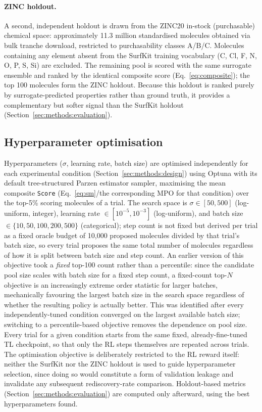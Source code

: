 \documentclass[11pt]{aime}
\begin{document}
\paragraph{ZINC holdout.}
A second, independent holdout is drawn from the ZINC20 in-stock (purchasable) chemical space\cite{irwin_zinc20_2020}: approximately 11.3 million standardised molecules obtained via bulk tranche download, restricted to purchasability classes A/B/C.
Molecules containing any element absent from the SurfKit training vocabulary (C, Cl, F, N, O, P, S, Si) are excluded.
The remaining pool is scored with the same surrogate ensemble and ranked by the identical composite score (Eq.~\ref{eq:composite}); the top 100 molecules form the ZINC holdout.
Because this holdout is ranked purely by surrogate-predicted properties rather than ground truth, it provides a complementary but softer signal than the SurfKit holdout (Section~\ref{sec:methods:evaluation}).

\subsection{Hyperparameter optimisation}
\label{sec:methods:hpo}

Hyperparameters ($\sigma$, learning rate, batch size) are optimised independently for each experimental condition (Section~\ref{sec:methods:design}) using Optuna\cite{optuna_2019} with its default tree-structured Parzen estimator sampler\cite{bergstra_algorithms_2011}, maximising the mean composite \texttt{Score} (Eq.~\ref{eq:sm}/the corresponding MPO for that condition) over the top-5\% scoring molecules of a trial.
The search space is $\sigma\in[50,500]$ (log-uniform, integer), learning rate $\in[10^{-5},10^{-3}]$ (log-uniform), and batch size $\in\{10,50,100,200,500\}$ (categorical); step count is not fixed but derived per trial as a fixed oracle budget of 10{,}000 proposed molecules divided by that trial's batch size, so every trial proposes the same total number of molecules regardless of how it is split between batch size and step count.
An earlier version of this objective took a \emph{fixed} top-100 count rather than a percentile: since the candidate pool size scales with batch size for a fixed step count, a fixed-count top-$N$ objective is an increasingly extreme order statistic for larger batches, mechanically favouring the largest batch size in the search space regardless of whether the resulting policy is actually better. This was identified after every independently-tuned condition converged on the largest available batch size; switching to a percentile-based objective removes the dependence on pool size.
Every trial for a given condition starts from the same fixed, already-fine-tuned TL checkpoint, so that only the RL steps themselves are repeated across trials.
The optimisation objective is deliberately restricted to the RL reward itself: neither the SurfKit nor the ZINC holdout is used to guide hyperparameter selection, since doing so would constitute a form of validation leakage and invalidate any subsequent rediscovery-rate comparison.
Holdout-based metrics (Section~\ref{sec:methods:evaluation}) are computed only afterward, using the best hyperparameters found.
\end{document}
